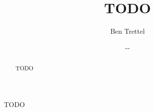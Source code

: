 \documentclass{bmtmin}
\author{Ben Trettel}
\title{TODO}
\date{\svnyear-\svnmonth-\svnday}
\begin{document}
\maketitle

\begin{abstract}
TODO
\end{abstract}

TODO

%
\end{document}
